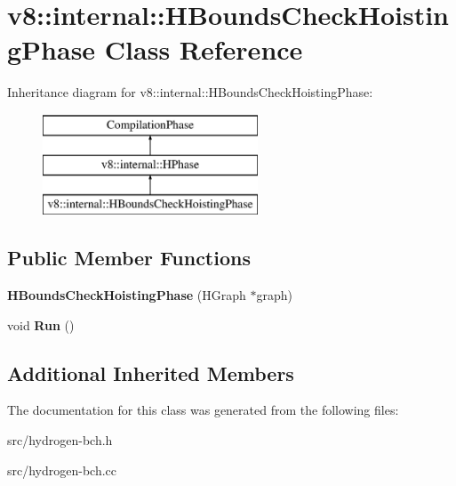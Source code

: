 \hypertarget{classv8_1_1internal_1_1_h_bounds_check_hoisting_phase}{}\section{v8\+:\+:internal\+:\+:H\+Bounds\+Check\+Hoisting\+Phase Class Reference}
\label{classv8_1_1internal_1_1_h_bounds_check_hoisting_phase}
Inheritance diagram for v8\+:\+:internal\+:\+:H\+Bounds\+Check\+Hoisting\+Phase\+:\begin{figure}[H]
\begin{center}
\leavevmode
\includegraphics[height=3.000000cm]{classv8_1_1internal_1_1_h_bounds_check_hoisting_phase}
\end{center}
\end{figure}
\subsection*{Public Member Functions}
\begin{DoxyCompactItemize}
\item 
\hypertarget{classv8_1_1internal_1_1_h_bounds_check_hoisting_phase_a5511ff9153204ae0a1dc67eb169e7510}{}{\bfseries H\+Bounds\+Check\+Hoisting\+Phase} (H\+Graph $\ast$graph)\label{classv8_1_1internal_1_1_h_bounds_check_hoisting_phase_a5511ff9153204ae0a1dc67eb169e7510}

\item 
\hypertarget{classv8_1_1internal_1_1_h_bounds_check_hoisting_phase_adee9f6f4141a162a73c647023f755705}{}void {\bfseries Run} ()\label{classv8_1_1internal_1_1_h_bounds_check_hoisting_phase_adee9f6f4141a162a73c647023f755705}

\end{DoxyCompactItemize}
\subsection*{Additional Inherited Members}


The documentation for this class was generated from the following files\+:\begin{DoxyCompactItemize}
\item 
src/hydrogen-\/bch.\+h\item 
src/hydrogen-\/bch.\+cc\end{DoxyCompactItemize}
